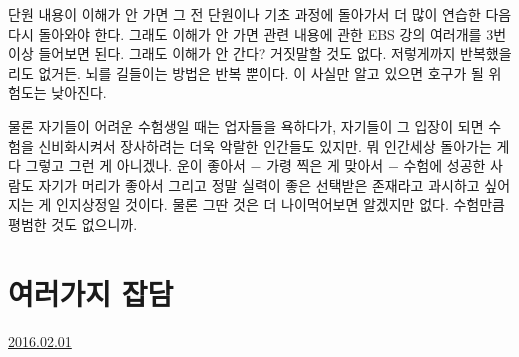 단원 내용이 이해가 안 가면 그 전 단원이나 기초 과정에 돌아가서 더 많이 연습한 다음 다시 돌아와야 한다.
그래도 이해가 안 가면 관련 내용에 관한 EBS 강의 여러개를 3번 이상 들어보면 된다.
그래도 이해가 안 간다? 거짓말할 것도 없다. 저렇게까지 반복했을리도 없거든.
뇌를 길들이는 방법은 반복 뿐이다. 이 사실만 알고 있으면 호구가 될 위험도는 낮아진다.
\vspace{5mm}

물론 자기들이 어려운 수험생일 때는 업자들을 욕하다가,
자기들이 그 입장이 되면 수험을 신비화시켜서 장사하려는 더욱 악랄한 인간들도 있지만.
뭐 인간세상 돌아가는 게 다 그렇고 그런 게 아니겠나.
운이 좋아서 $-$ 가령 찍은 게 맞아서 $-$ 수험에 성공한 사람도
자기가 머리가 좋아서 그리고 정말 실력이 좋은 선택받은 존재라고 과시하고 싶어지는 게 인지상정일 것이다.
물론 그딴 것은 더 나이먹어보면 알겠지만 없다.
수험만큼 평범한 것도 없으니까.
\vspace{5mm}




\section{여러가지 잡담}
\href{https://www.kockoc.com/Apoc/619855}{2016.02.01}

